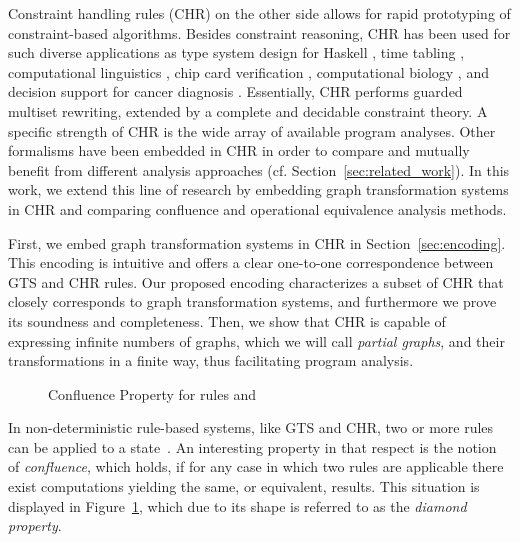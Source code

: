 \documentclass{tlp}
\begin{document}
Constraint handling rules (CHR) \cite{fruehwirth09} on the other side allows for
rapid prototyping of constraint-based algorithms. Besides constraint reasoning,
CHR has been used for such diverse applications as type system design for Haskell
\cite{sulz_schr_stuck_aplas06}, time tabling
\cite{abd_marte_timetabling_chr_aai00}, computational linguistics
\cite{dahl_maharshak_dna_replication_iwinac09}, chip card verification
\cite{pretschner_et_al_model-based_testing_sttt04}, computational biology
\cite{bavarian_dahl_bio_seq_analysis_jucs06}, and decision support for cancer
diagnosis \cite{alma_thesis05}. Essentially, CHR performs guarded multiset
rewriting, extended by a complete and decidable constraint theory. A specific
strength of CHR is the wide array of available program analyses. Other formalisms
have been embedded in CHR in order to compare and mutually benefit from different
analysis approaches (cf. Section~\ref{sec:related_work}). In this work, we extend
this line of research by embedding graph transformation systems in CHR and
comparing confluence and operational equivalence analysis methods.

First, we embed graph transformation systems in CHR \cite{raiser07iclp} in
Section~\ref{sec:encoding}. This encoding is intuitive and offers a clear
one-to-one correspondence between GTS and CHR rules. Our proposed encoding
characterizes a subset of CHR that closely corresponds to graph transformation
systems, and furthermore we prove its soundness and completeness. Then, we show
that CHR is capable of expressing infinite numbers of graphs, which we will call
\emph{partial graphs}, and their transformations in a finite way, thus
facilitating program analysis.

\begin{figure} 
\centerline{
}
\caption{Confluence Property for rules  and }
\label{fig:confluence}
\end{figure}

In non-deterministic rule-based systems, like GTS and CHR, two or more rules can
be applied to a state~. An interesting property in that respect is the
notion of \emph{confluence}, which holds, if for any case in which two rules are
applicable there exist computations yielding the same, or equivalent, results.
This situation is displayed in Figure~\ref{fig:confluence}, which due to its
shape is referred to as the \emph{diamond property}.
\end{document}
